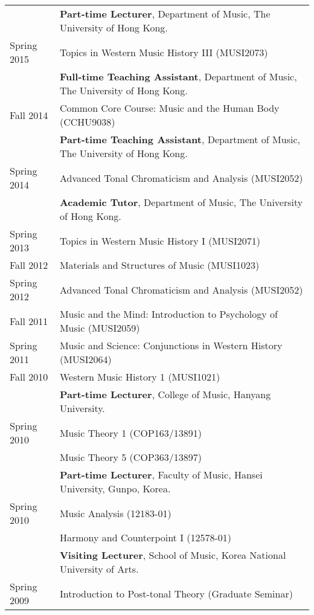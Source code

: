 \documentclass[a4,11pt,draft]{article}
\begin{document}
  \hspace*{-0.25cm}
  \begin{tabular}{p{2.5cm} l}
    & \textbf{Part-time Lecturer}, Department of Music, The University of Hong Kong.\\
    Spring 2015 & Topics in Western Music History III (MUSI2073)\\[2mm]
    
    & \textbf{Full-time Teaching Assistant}, Department of Music, The University of Hong Kong.\\
    Fall 2014 & Common Core Course: Music and the Human Body (CCHU9038)\\[2mm]
    
    & \textbf{Part-time Teaching Assistant}, Department of Music, The University of Hong Kong.\\
    Spring 2014 & Advanced Tonal Chromaticism and Analysis (MUSI2052)\\[2mm]
    
    & \textbf{Academic Tutor}, Department of Music, The University of Hong Kong.\\
    Spring 2013 & Topics in Western Music History I (MUSI2071)\\
    Fall 2012 & Materials and Structures of Music (MUSI1023)\\
    Spring 2012 & Advanced Tonal Chromaticism and Analysis (MUSI2052)\\
    Fall 2011 & Music and the Mind: Introduction to Psychology of Music (MUSI2059)\\
    Spring 2011 & Music and Science: Conjunctions in Western History (MUSI2064)\\
    Fall 2010 & Western Music History 1 (MUSI1021)\\[2mm]
    
    & \textbf{Part-time Lecturer}, College of Music, Hanyang University.\\
    Spring 2010 & Music Theory 1 (COP163/13891)\\
    & Music Theory 5 (COP363/13897)\\[2mm]

		& \textbf{Part-time Lecturer}, Faculty of Music, Hansei University, Gunpo, Korea.\\
		Spring 2010 & Music Analysis (12183-01)\\
		& Harmony and Counterpoint I (12578-01)\\[2mm]
		
		& \textbf{Visiting Lecturer}, School of Music, Korea National University of Arts.\\
		Spring 2009 & Introduction to Post-tonal Theory (Graduate Seminar)
  \end{tabular}
  
\end{document}
